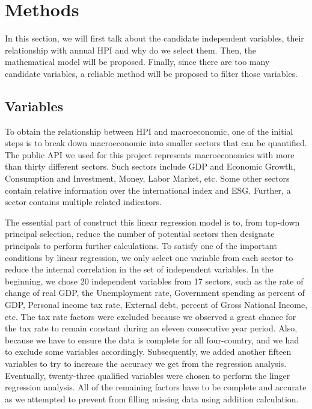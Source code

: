 \documentclass[11pt]{article}
\begin{document}
\section{Methods}\label{methods}
In this section, we will first talk about the candidate independent variables, their relationship with annual HPI and why do we select them. Then, the mathematical model will be proposed. Finally, since there are too many candidate variables, a reliable method will be proposed to filter those variables.

\subsection{Variables}\label{variables}
To obtain the relationship between HPI and macroeconomic, one of the initial steps is to break down macroeconomic into smaller sectors that can be quantified. The public API we used for this project represents macroeconomics with more than thirty different sectors. Such sectors include GDP and Economic Growth, Consumption and Investment, Money, Labor Market, etc. Some other sectors contain relative information over the international index and ESG. Further, a sector contains multiple related indicators.

The essential part of construct this linear regression model is to, from top-down principal selection, reduce the number of potential sectors then designate principals to perform further calculations.  To satisfy one of the important conditions by linear regression, we only select one variable from each sector to reduce the internal correlation in the set of independent variables. In the beginning, we chose 20 independent variables from 17 sectors, such as the rate of change of real GDP, the Unemployment rate, Government spending as percent of GDP, Personal income tax rate,     External debt, percent of Gross National Income, etc. The tax rate factors were excluded because we observed a great chance for the tax rate to remain constant during an eleven consecutive year period. Also, because we have to ensure the data is complete for all four-country, and we had to exclude some variables accordingly. Subsequently, we added another fifteen variables to try to increase the accuracy we get from the regression analysis. Eventually, twenty-three qualified variables were chosen to perform the linger regression analysis. All of the remaining factors have to be complete and accurate as we attempted to prevent from filling missing data using addition calculation. 
\end{document}
